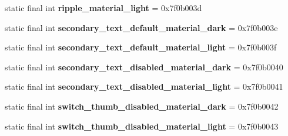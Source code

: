 \begin{DoxyCompactItemize}
\item 
\hypertarget{classandroid_1_1support_1_1design_1_1_r_1_1color_a587b8e8b3b093ff91615e0ac3120fd70}{}static final int {\bfseries ripple\+\_\+material\+\_\+light} = 0x7f0b003d\label{classandroid_1_1support_1_1design_1_1_r_1_1color_a587b8e8b3b093ff91615e0ac3120fd70}

\item 
\hypertarget{classandroid_1_1support_1_1design_1_1_r_1_1color_a6f174e05ba31135d1c5c92593120f324}{}static final int {\bfseries secondary\+\_\+text\+\_\+default\+\_\+material\+\_\+dark} = 0x7f0b003e\label{classandroid_1_1support_1_1design_1_1_r_1_1color_a6f174e05ba31135d1c5c92593120f324}

\item 
\hypertarget{classandroid_1_1support_1_1design_1_1_r_1_1color_a72180126550e159673be266d96a21b96}{}static final int {\bfseries secondary\+\_\+text\+\_\+default\+\_\+material\+\_\+light} = 0x7f0b003f\label{classandroid_1_1support_1_1design_1_1_r_1_1color_a72180126550e159673be266d96a21b96}

\item 
\hypertarget{classandroid_1_1support_1_1design_1_1_r_1_1color_a439b5b7bfd6aaf629ee7d085c3e36ea2}{}static final int {\bfseries secondary\+\_\+text\+\_\+disabled\+\_\+material\+\_\+dark} = 0x7f0b0040\label{classandroid_1_1support_1_1design_1_1_r_1_1color_a439b5b7bfd6aaf629ee7d085c3e36ea2}

\item 
\hypertarget{classandroid_1_1support_1_1design_1_1_r_1_1color_ae27cdcff381386cb13c4d0c01c85db0e}{}static final int {\bfseries secondary\+\_\+text\+\_\+disabled\+\_\+material\+\_\+light} = 0x7f0b0041\label{classandroid_1_1support_1_1design_1_1_r_1_1color_ae27cdcff381386cb13c4d0c01c85db0e}

\item 
\hypertarget{classandroid_1_1support_1_1design_1_1_r_1_1color_aa72f26814bf37414e4094fdc0439c85a}{}static final int {\bfseries switch\+\_\+thumb\+\_\+disabled\+\_\+material\+\_\+dark} = 0x7f0b0042\label{classandroid_1_1support_1_1design_1_1_r_1_1color_aa72f26814bf37414e4094fdc0439c85a}

\item 
\hypertarget{classandroid_1_1support_1_1design_1_1_r_1_1color_aa7d7ba16921f098226179c0cc9110c0c}{}static final int {\bfseries switch\+\_\+thumb\+\_\+disabled\+\_\+material\+\_\+light} = 0x7f0b0043\label{classandroid_1_1support_1_1design_1_1_r_1_1color_aa7d7ba16921f098226179c0cc9110c0c}


\end{DoxyCompactItemize}
